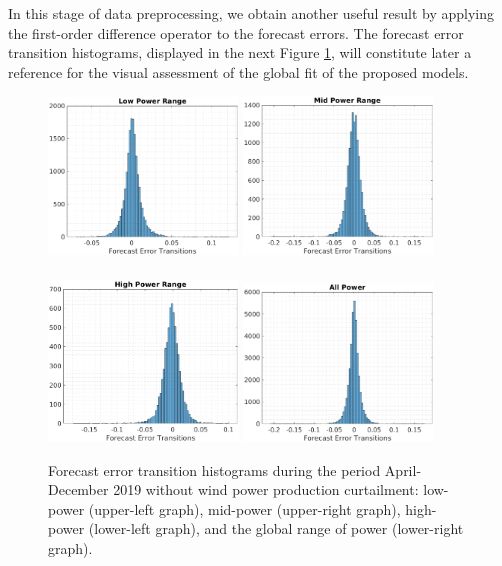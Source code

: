 \documentclass[11pt]{article}
\theoremstyle{definition}
\begin{document}
In this stage of data preprocessing, we obtain another useful result by applying the first-order difference operator to the forecast errors. 
The forecast error transition histograms, displayed in the next Figure \ref{fig:error_transitions}, will constitute later a reference for the visual assessment of the global fit of the proposed models.

\begin{figure}[H]
\centering
\includegraphics[width=0.45\textwidth]{plots/LP_t.eps}
\includegraphics[width=0.45\textwidth]{plots/MP_t.eps}\\
\quad\\
\includegraphics[width=0.45\textwidth]{plots/HP_t.eps}
\includegraphics[width=0.45\textwidth]{plots/AP_t.eps}
\caption{Forecast error transition histograms during the period April-December 2019 without wind power production curtailment: low-power (upper-left graph), mid-power (upper-right graph), high-power (lower-left graph), and the global range of power (lower-right graph).}
\label{fig:error_transitions}
\end{figure}
\end{document}
